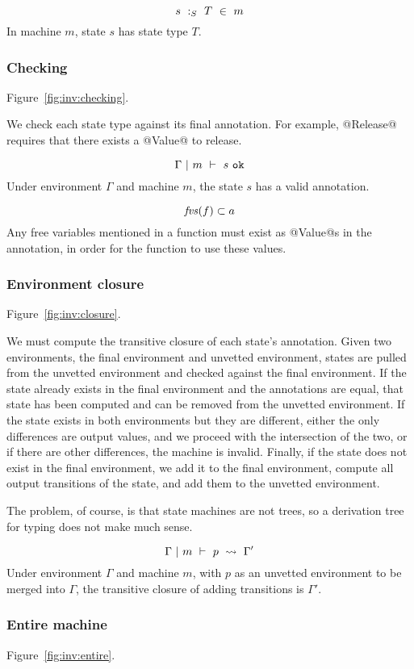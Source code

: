 $$ s ~:_S~ T ~\in~m $$
In machine $m$, state $s$ has state type $T$.


\subsubsection{Checking}
Figure~\ref{fig:inv:checking}.

We check each state type against its final annotation. For example, @Release@ requires that there exists a @Value@ to release.

$$ \Gamma ~|~ m ~\vdash~ s~\mathtt{ok} $$
Under environment $\Gamma$ and machine $m$, the state $s$ has a valid annotation.

$$ \mathit{fvs}(f) \subset a $$
Any free variables mentioned in a function must exist as @Value@s in the annotation, in order for the function to use these values.

\subsubsection{Environment closure}
Figure~\ref{fig:inv:closure}.

We must compute the transitive closure of each state's annotation.
Given two environments, the final environment and unvetted environment, states are pulled from the unvetted environment and checked against the final environment.
If the state already exists in the final environment and the annotations are equal, that state has been computed and can be removed from the unvetted environment.
If the state exists in both environments but they are different, either the only differences are output values, and we proceed with the intersection of the two, or if there are other differences, the machine is invalid.
Finally, if the state does not exist in the final environment, we add it to the final environment, compute all output transitions of the state, and add them to the unvetted environment.

The problem, of course, is that state machines are not trees, so a derivation tree for typing does not make much sense.

$$ \Gamma ~|~ m ~\vdash~ p ~\rightsquigarrow~ \Gamma' $$
Under environment $\Gamma$ and machine $m$, with $p$ as an unvetted environment to be merged into $\Gamma$, the transitive closure of adding transitions is $\Gamma'$.

\subsubsection{Entire machine}
Figure~\ref{fig:inv:entire}.

